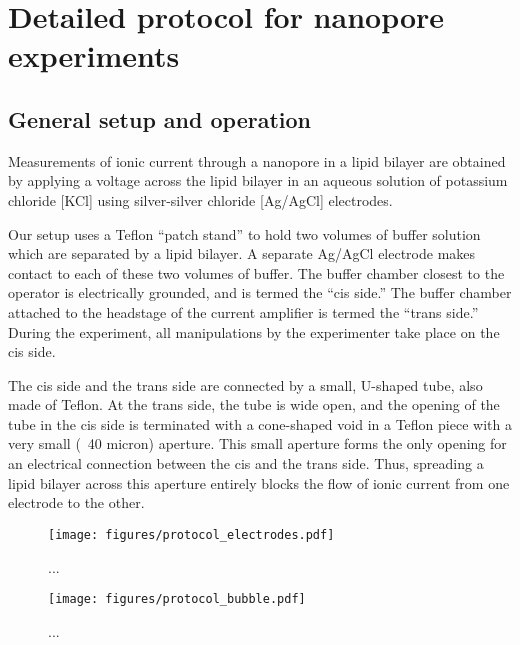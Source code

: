 \chapter{Detailed protocol for nanopore experiments}
\label{protocol}

\section{General setup and operation}

Measurements of ionic current through a nanopore in a lipid bilayer are obtained by applying a voltage across the lipid bilayer in an aqueous solution of potassium chloride [KCl] using silver-silver chloride [Ag/AgCl] electrodes.

Our setup uses a Teflon “patch stand” to hold two volumes of buffer solution which are separated by a lipid bilayer.  A separate Ag/AgCl electrode makes contact to each of these two volumes of buffer.  The buffer chamber closest to the operator is electrically grounded, and is termed the “cis side.”  The buffer chamber attached to the headstage of the current amplifier is termed the “trans side.”  During the experiment, all manipulations by the experimenter take place on the cis side.

The cis side and the trans side are connected by a small, U-shaped tube, also made of Teflon.  At the trans side, the tube is wide open, and the opening of the tube in the cis side is terminated with a cone-shaped void in a Teflon piece with a very small (~40 micron) aperture.  This small aperture forms the only opening for an electrical connection between the cis and the trans side.  Thus, spreading a lipid bilayer across this aperture entirely blocks the flow of ionic current from one electrode to the other.

\begin{figure}[h]
\begin{centering}
\texttt{[image: figures/protocol\_electrodes.pdf]}
\caption[Preparing silver chloride electrodes]{...}
\label{fig:helicase_data}
\end{centering}
\end{figure}

\begin{figure}[h]
\begin{centering}
\texttt{[image: figures/protocol\_bubble.pdf]}
\caption[Establishing a lipid membrane with a bubble]{...}
\label{fig:helicase_data}
\end{centering}
\end{figure}

